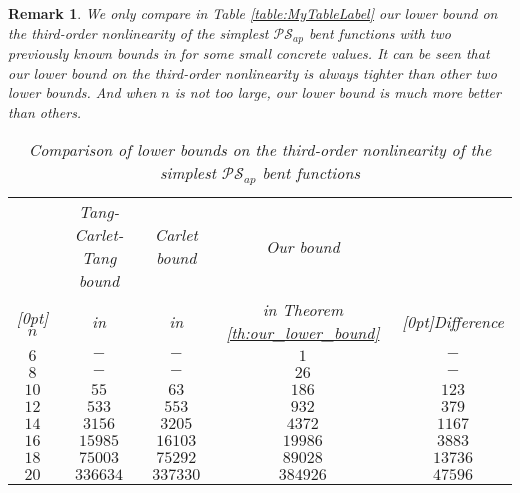 \documentclass{article}
\newcommand{\0}{\textbf{0}}
\newcommand{\1}{\textbf{1}}
\theoremstyle{plain}
\newtheorem{remark}{Remark}
\begin{document}
    \begin{remark}
        \newcommand{\rb}[1]{\raisebox{1.5ex}[0pt]{#1}}
        We only compare in Table \ref{table:MyTableLabel} our lower bound on the third-order nonlinearity of the simplest $\mathcal{PS}_{ap}$ bent functions with two previously known bounds  in \cite{TangCT2013NL_2bent,Carlet2011NL_Profile_Dillon} for some small concrete values.
        It can be seen that our lower bound on the third-order nonlinearity is always tighter than other two lower bounds.
        And when $n$ is not too large, our lower bound is much more better than others.
        \begin{table}
            \centering
            \caption{Comparison of lower bounds on the third-order nonlinearity of the simplest $\mathcal{PS}_{ap}$ bent functions}
            \begin{threeparttable}
                \begin{tabular}{|c|c|c|c|c|}
                    \hline
                            & Tang-Carlet-Tang bound      & Carlet bound                            & Our bound& \\
                    \rb{$n$}& in \cite{TangCT2013NL_2bent}& in \cite{Carlet2011NL_Profile_Dillon} & in Theorem \ref{th:our_lower_bound}     &\rb{Difference\tnote{1}}   \\
                    \hline
                    $6  $ &  $ -           $       & $ -        $     & $ 1        $     & $  -       $ \\  \hline
                    $8  $ &  $ -           $       & $ -        $     & $ 26       $     & $  -       $ \\  \hline
                    $10 $ &  $ 55          $       & $ 63       $     & $ 186      $     & $  123     $ \\  \hline
                    $12 $ &  $ 533         $       & $ 553      $     & $ 932      $     & $  379     $ \\  \hline
                    $14 $ &  $ 3156        $       & $ 3205     $     & $ 4372     $     & $  1167    $ \\  \hline
                    $16 $ &  $ 15985       $       & $ 16103    $     & $ 19986    $     & $  3883    $ \\  \hline
                    $18 $ &  $ 75003       $       & $ 75292    $     & $ 89028    $     & $  13736   $ \\  \hline
                    $20 $ &  $ 336634      $       & $ 337330   $     & $ 384926   $     & $  47596   $ \\  \hline

\end{tabular}
\end{threeparttable}
\end{table}
\end{remark}
\end{document}
